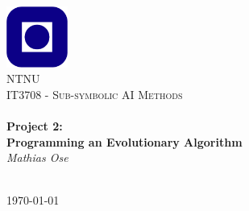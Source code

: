 \begin{titlepage}
\begin{center}
\includegraphics[width=0.15\textwidth]{img/NTNU.png}~\\[1cm]

\textsc{\LARGE NTNU}\\[1.5cm]

\textsc{\Large IT3708 - Sub-symbolic AI Methods}\\[0.5cm]

\HRule \\[0.4cm]
{\huge \bfseries Project 2: \\ Programming an Evolutionary Algorithm}\\[0.5cm]
{\large \textit{Mathias Ose}}\\[0.2cm]
\HRule \\[1.5cm]



\vfill

{\large \today}
\end{center}
\end{titlepage}
